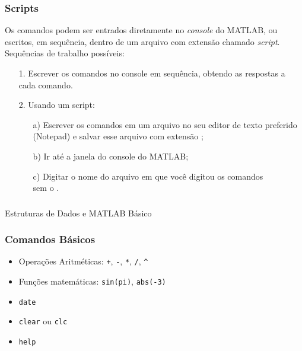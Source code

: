 \documentclass{beamer}
\newcommand{\kw}[1]{\alert{\texttt{#1}}}
\newcommand{\code}[1]{{\texttt{#1}}}
\begin{document}
\begin{frame}
   \frametitle{Scripts}
   Os comandos podem ser entrados diretamente no \emph{console} do MATLAB, ou escritos, em sequência, dentro de um arquivo com extensão {} chamado \emph{script}.
   \vfill
   Sequências de trabalho possíveis:
   \begin{itemize}
      \item[1.] Escrever os comandos no console em sequência, obtendo as respostas a cada comando.
      \item[2.] Usando um script:
      \begin{itemize}
         \item[a)] Escrever os comandos em um arquivo no seu editor de texto preferido (Notepad) e salvar esse arquivo com extensão \alert{};
         \item[b)] Ir até a janela do console do MATLAB;
         \item[c)] Digitar o nome do arquivo em que você digitou os comandos \\\alert{sem o {}}.
      \end{itemize}
   \end{itemize}
\end{frame}
\begin{frame}
  \frametitle{}
  \begin{center}
    \alert{Estruturas de Dados e MATLAB Básico}
  \end{center}
\end{frame}
\begin{frame}
   \frametitle{Comandos Básicos}
   \begin{itemize}[<+->]
      \item Operações Aritméticas: \kw{+}, \kw{-}, \kw{*}, \kw{/}, \kw{\^{}}
      \item \alert{Funções} matemáticas: \kw{sin}\code{(pi)}, \kw{abs}\code{(-3)}
      \item \kw{date}
      \item \alert{\texttt{clear}} ou \alert{\texttt{clc}}
      \item \alert{\texttt{help}}
   \end{itemize}
\end{frame}
\end{document}
